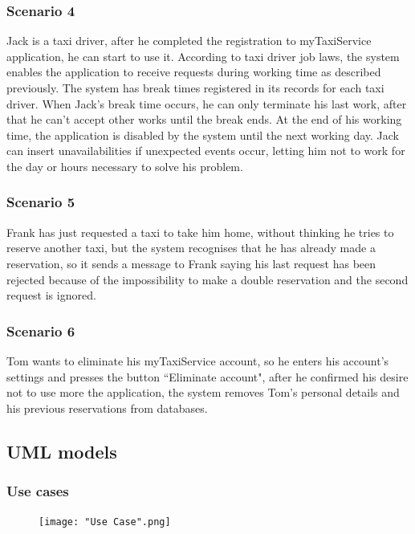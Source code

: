 \documentclass[a4paper,12pt]{article}%
\begin{document}
\subsubsection{Scenario 4} 
Jack is a taxi driver, after he completed the registration to myTaxiService application, he can start to use it. According to taxi driver job laws, the system enables the application to receive requests during working time as described previously. The system has break times registered in its records for each taxi driver. When Jack's break time occurs, he can only terminate his last work, after that he can't accept other works until the break ends. At the end of his working time, the application is disabled by the system until the next working day. Jack can insert unavailabilities if unexpected events occur, letting him not to work for the day or hours necessary to solve his problem. 
\subsubsection{Scenario 5}
Frank has just requested a taxi to take him home, without thinking he tries to reserve another taxi, but the system recognises that he has already made a reservation, so it sends a message to Frank saying his last request has been rejected because of the impossibility to make a double reservation and the second request is ignored.
\subsubsection{Scenario 6}  
Tom wants to eliminate his myTaxiService account, so he enters his account's settings and presses the button ``Eliminate account", after he confirmed his desire not to use more the application, the system removes Tom's personal details and his previous reservations from databases.

\pagebreak
\subsection{UML models}
\subsubsection{Use cases} 
\begin{figure}[H]
\centering
\texttt{[image: "Use Case".png]}
\end{figure}
\break
\end{document}
